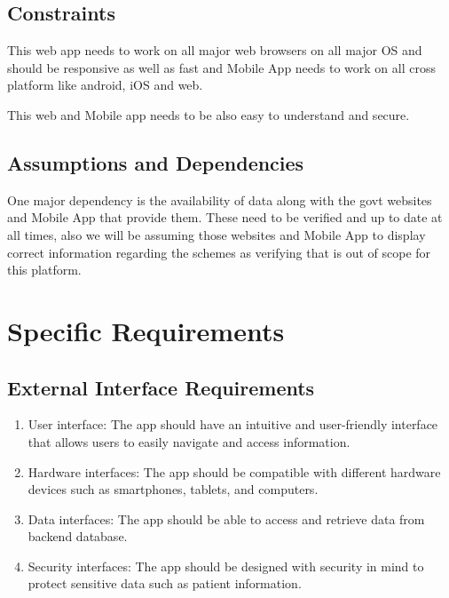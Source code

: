 \documentclass{article}
\begin{document}
\subsection{Constraints}
This web app needs to work on all major web browsers on all major OS and
should be responsive as well as fast and Mobile App needs to work on all
cross platform like android, iOS and web.

This web and Mobile app needs to be also easy to understand and secure.

\subsection{Assumptions and Dependencies}
One major dependency is the availability of data along with the govt
websites and Mobile App that provide them. These need to be verified and
up to date at all times, also we will be assuming those websites and
Mobile App to display correct information regarding the schemes as
verifying that is out of scope for this platform.

\section{Specific Requirements}
\subsection{External Interface Requirements}
\begin{enumerate}
\item
  User interface: The app should have an intuitive and user-friendly
  interface that allows users to easily navigate and access information.
\item
  Hardware interfaces: The app should be compatible with different
  hardware devices such as smartphones, tablets, and computers.
\item
  Data interfaces: The app should be able to access and retrieve data
  from backend database.
\item
  Security interfaces: The app should be designed with security in mind
  to protect sensitive data such as patient information.
\end{enumerate}
\end{document}
